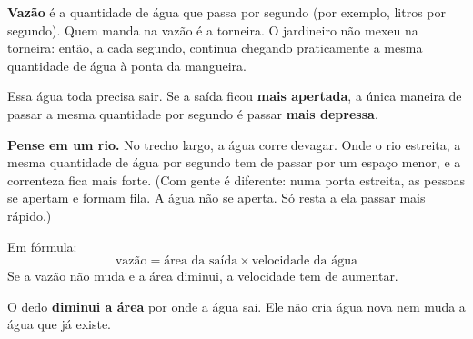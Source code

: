 \begin{enunciado}

\end{enunciado}


\begin{ideia}
\textbf{Vazão} é a quantidade de água que passa por segundo (por exemplo, litros por segundo). Quem manda na vazão é a torneira.
O jardineiro não mexeu na torneira: então, a cada segundo, continua chegando praticamente a mesma quantidade de água à ponta da mangueira.

Essa água toda precisa sair. Se a saída ficou \textbf{mais apertada}, a única maneira de passar a mesma quantidade por segundo
é passar \textbf{mais depressa}.

\textbf{Pense em um rio.} No trecho largo, a água corre devagar. Onde o rio estreita, a mesma quantidade de água por segundo
tem de passar por um espaço menor, e a correnteza fica mais forte. (Com gente é diferente: numa porta estreita, as pessoas se
apertam e formam fila. A água não se aperta. Só resta a ela passar mais rápido.)

Em fórmula:
\[ \text{vazão} = \text{área da saída} \times \text{velocidade da água} \]
Se a vazão não muda e a área diminui, a velocidade tem de aumentar.

\begin{center}
\end{center}
\end{ideia}

\passoapasso
{}
O dedo \textbf{diminui a área} por onde a água sai. Ele não cria água nova nem muda a água que já existe.

